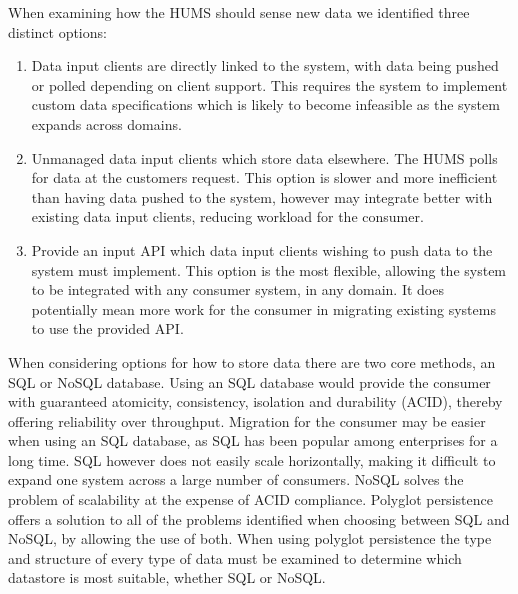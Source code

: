 \documentclass[10pt,a4paper]{article}
\begin{document}
When examining how the HUMS should sense new data we identified three distinct
options:
\begin{enumerate}
	\item Data input clients are directly linked to the system, with data being
	      pushed or polled depending on client support. This requires the system
	      to implement custom data specifications which is likely to become
	      infeasible as the system expands across domains.
	\item Unmanaged data input clients which store data elsewhere. The HUMS polls
	      for data at the customers request. This option is slower and more
	      inefficient than having data pushed to the system, however may integrate
	      better with existing data input clients, reducing workload for the
	      consumer.
	\item Provide an input API which data input clients wishing to push data to
	      the system must implement. This option is the most flexible, allowing
	      the system to be integrated with any consumer system, in any domain. It
	      does potentially mean more work for the consumer in migrating existing
	      systems to use the provided API. 
\end{enumerate} 
When considering options for how to store data there are two core methods, an
SQL or NoSQL database. Using an SQL database would provide the consumer with
guaranteed atomicity, consistency, isolation and durability (ACID), thereby
offering reliability over throughput. Migration for the consumer may be easier
when using an SQL database, as SQL has been popular among enterprises for a long
time. SQL however does not easily scale horizontally, making it difficult to
expand one system across a large number of consumers. NoSQL solves the problem
of scalability at the expense of ACID compliance. Polyglot persistence offers a
solution to all of the problems identified when choosing between SQL and NoSQL,
by allowing the use of both. When using polyglot persistence the type and
structure of every type of data must be examined to determine which datastore is
most suitable, whether SQL or NoSQL.
\end{document}
